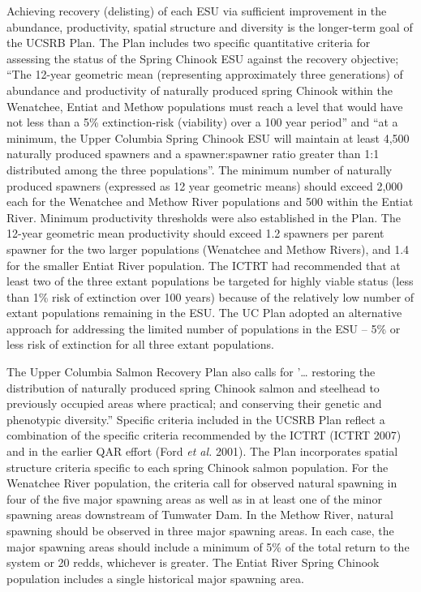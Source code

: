 \documentclass[
  letterpaper,
  oneside,
  open=any]{scrbook}
\begin{document}
Achieving recovery (delisting) of each ESU via sufficient improvement in
the abundance, productivity, spatial structure and diversity is the
longer-term goal of the UCSRB Plan. The Plan includes two specific
quantitative criteria for assessing the status of the Spring Chinook ESU
against the recovery objective; ``The 12-year geometric mean
(representing approximately three generations) of abundance and
productivity of naturally produced spring Chinook within the Wenatchee,
Entiat and Methow populations must reach a level that would have not
less than a 5\% extinction-risk (viability) over a 100 year period'' and
``at a minimum, the Upper Columbia Spring Chinook ESU will maintain at
least 4,500 naturally produced spawners and a spawner:spawner ratio
greater than 1:1 distributed among the three populations''. The minimum
number of naturally produced spawners (expressed as 12 year geometric
means) should exceed 2,000 each for the Wenatchee and Methow River
populations and 500 within the Entiat River. Minimum productivity
thresholds were also established in the Plan. The 12-year geometric mean
productivity should exceed 1.2 spawners per parent spawner for the two
larger populations (Wenatchee and Methow Rivers), and 1.4 for the
smaller Entiat River population. The ICTRT had recommended that at least
two of the three extant populations be targeted for highly viable status
(less than 1\% risk of extinction over 100 years) because of the
relatively low number of extant populations remaining in the ESU. The UC
Plan adopted an alternative approach for addressing the limited number
of populations in the ESU -- 5\% or less risk of extinction for all
three extant populations.

The Upper Columbia Salmon Recovery Plan also calls for '\ldots{}
restoring the distribution of naturally produced spring Chinook salmon
and steelhead to previously occupied areas where practical; and
conserving their genetic and phenotypic diversity.'' Specific criteria
included in the UCSRB Plan reflect a combination of the specific
criteria recommended by the ICTRT (ICTRT 2007) and in the earlier QAR
effort (Ford \emph{et al.} 2001). The Plan incorporates spatial
structure criteria specific to each spring Chinook salmon population.
For the Wenatchee River population, the criteria call for observed
natural spawning in four of the five major spawning areas as well as in
at least one of the minor spawning areas downstream of Tumwater Dam. In
the Methow River, natural spawning should be observed in three major
spawning areas. In each case, the major spawning areas should include a
minimum of 5\% of the total return to the system or 20 redds, whichever
is greater. The Entiat River Spring Chinook population includes a single
historical major spawning area.
\end{document}
